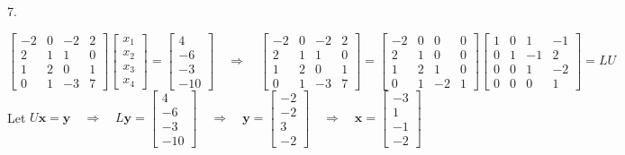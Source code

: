 \documentclass[12pt]{book}
\begin{document}
\begin{CJK}{UTF8}{bsmi}
7. \begin{minipage}[t]{\dimexpr\linewidth-2em}
$\begin{bmatrix}
-2 &  0 & -2 &  2 \\
 2 &  1 &  1 &  0 \\
 1 &  2 &  0 &  1 \\
 0 &  1 & -3 &  7
\end{bmatrix}\begin{bmatrix}
x_1 \\ x_2 \\ x_3 \\ x_4
\end{bmatrix}=\begin{bmatrix}
4 \\ -6 \\ -3 \\ -10
\end{bmatrix}\quad\Rightarrow\quad\begin{bmatrix}
-2 &  0 & -2 &  2 \\
 2 &  1 &  1 &  0 \\
 1 &  2 &  0 &  1 \\
 0 &  1 & -3 &  7
\end{bmatrix}=\begin{bmatrix}
-2 &  0 &  0 &  0 \\
 2 &  1 &  0 &  0 \\
 1 &  2 &  1 &  0 \\
 0 &  1 & -2 &  1
\end{bmatrix}\begin{bmatrix}
1 & 0 &  1 & -1 \\
0 & 1 & -1 &  2 \\
0 & 0 &  1 & -2 \\
0 & 0 &  0 &  1
\end{bmatrix}=LU$ \\
Let $U\textbf{x}=\textbf{y}\quad\Rightarrow\quad L\textbf{y}=\begin{bmatrix}
4 \\ -6 \\ -3 \\ -10
\end{bmatrix}\quad\Rightarrow\quad\textbf{y}=\begin{bmatrix}
-2 \\ -2 \\ 3 \\ -2
\end{bmatrix}\quad\Rightarrow\quad\textbf{x}=\begin{bmatrix}
-3 \\ 1 \\ -1 \\ -2
\end{bmatrix}$
\end{minipage}\\


\end{CJK}
\end{document}
